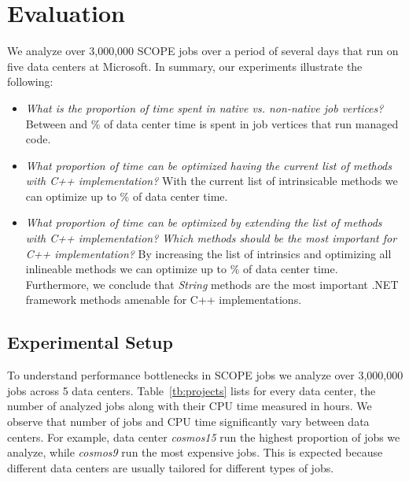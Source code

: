 \section{Evaluation}
We analyze over 3,000,000 SCOPE jobs over a period of several days that run on five data centers at Microsoft. In summary, our experiments illustrate the following:

\begin{itemize}
\item \emph{What is the proportion of time spent in native vs. non-native job vertices?} Between \nonNativeTimeL{} and \nonNativeTimeU \% of data center time is spent in job vertices that run managed code.

\item \emph{What proportion of time can be optimized having the current list of methods with C++ implementation?} With the current list of intrinsicable methods we can optimize up to \optimizableU{} \% of data center time.

\item \emph{What proportion of time can be optimized by extending the list of methods with C++ implementation? Which methods should be the most important for C++ implementation?}
By increasing the list of intrinsics and optimizing all inlineable methods we can optimize up to \potentiallyOptimizableU{} \% of data center time. Furthermore, we conclude that \emph{String} methods are the most important .NET framework methods amenable for C++ implementations.


\end{itemize}

\subsection{Experimental Setup}
To understand performance bottlenecks in SCOPE jobs we analyze over 3,000,000 jobs across 5 data centers. Table~\ref{tb:projects} lists for every data center, the number of analyzed jobs along with their CPU time measured in hours. We observe that number of jobs and CPU time significantly vary between data centers. For example, data center \emph{cosmos15} run the highest proportion of jobs we analyze, while \emph{cosmos9} run the most expensive jobs. This is expected because different data centers are usually tailored for different types of jobs. 


